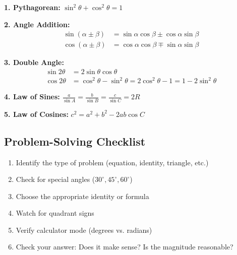\documentclass[12pt]{extarticle}
\begin{document}
\begin{conceptbox}
\textbf{1. Pythagorean:} $\sin^2\theta + \cos^2\theta = 1$

\textbf{2. Angle Addition:}
\begin{align*}
\sin(\alpha \pm \beta) &= \sin\alpha\cos\beta \pm \cos\alpha\sin\beta \\
\cos(\alpha \pm \beta) &= \cos\alpha\cos\beta \mp \sin\alpha\sin\beta
\end{align*}

\textbf{3. Double Angle:}
\begin{align*}
\sin 2\theta &= 2\sin\theta\cos\theta \\
\cos 2\theta &= \cos^2\theta - \sin^2\theta = 2\cos^2\theta - 1 = 1 - 2\sin^2\theta
\end{align*}

\textbf{4. Law of Sines:} $\frac{a}{\sin A} = \frac{b}{\sin B} = \frac{c}{\sin C} = 2R$

\textbf{5. Law of Cosines:} $c^2 = a^2 + b^2 - 2ab\cos C$
\end{conceptbox}

\subsection{Problem-Solving Checklist}

\begin{enumerate}
\item Identify the type of problem (equation, identity, triangle, etc.)
\item Check for special angles ($30^\circ, 45^\circ, 60^\circ$)
\item Choose the appropriate identity or formula
\item Watch for quadrant signs
\item Verify calculator mode (degrees vs. radians)
\item Check your answer: Does it make sense? Is the magnitude reasonable?
\end{enumerate}
\end{document}
